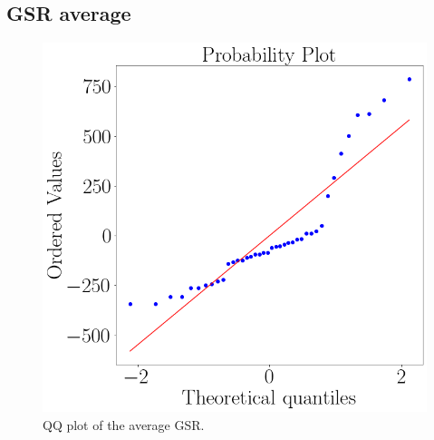 \subsection{GSR average}
    \begin{figure}[!htb]
        \begin{minipage}{0.45\linewidth}
            \centering
            \includegraphics[width = \linewidth]{Resultados/GSR/Figuras/png/qqplot_gsr_avg.png}
            \caption{QQ plot of the average GSR.}
            \label{fig:qqplot_gsr_avg}
        \end{minipage}
        \begin{minipage}{0.1\linewidth}
            \hfill
        \end{minipage}
        \begin{minipage}{0.45\linewidth}
            \centering

\end{minipage}
\end{figure}
